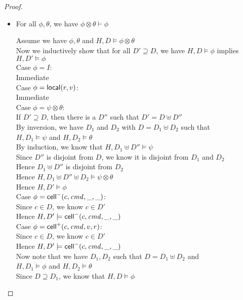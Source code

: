 \begin{proof}
\begin{itemize}
\item For all $\phi, \theta$, we have $\phi \otimes \theta \vdash \phi$
\begin{tabbedproof}
\oo Assume we have $\phi, \theta$ and $H, D \models \phi \otimes \theta$ \\
\oo Now we inductively show that for all $D' \supseteq D$, we have $H, D \models \phi$ implies $H, D' \models \phi$ \\
\ooo Case $\phi = I$: \\
\oooo Immediate \\
\ooo Case $\phi = \mathsf{local}({r}, {v})$: \\
\oooo Immediate\\
\ooo Case $\phi = \psi \otimes \theta$: \\
\oooo If $D' \supseteq D$, then there is a $D''$ such that $D' = D \uplus D''$ \\
\oooo By inversion, we have $D_1$ and $D_2$ with $D = D_1 \uplus D_2$ such that \\
\ooox $H, D_1 \models \psi$ and $H, D_2 \models \theta$ \\
\oooo By induction, we know that $H, D_1 \uplus D'' \models \psi$ \\
\oooo Since $D''$ is disjoint from $D$, we know it is disjoint from $D_1$ and $D_2$ \\
\oooo Hence $D_1 \uplus D''$ is disjoint from $D_2$ \\
\oooo Hence $H, D_1 \uplus D'' \uplus D_2 \models \psi \otimes \theta$ \\
\oooo Hence $H, D' \models \phi$ \\
\ooo Case $\phi = \mathsf{cell}^{-}({c}, {\mathit{cmd}}, {\_}, {\_})$: \\
\oooo Since $c \in D$, we know $c \in D'$ \\
\oooo Hence $H, D' \models \mathsf{cell}^{-}({c}, {\mathit{cmd}}, {\_}, {\_})$ \\
\ooo Case $\phi = \mathsf{cell}^{+}({c}, {\mathit{cmd}}, {v}, {r})$: \\
\oooo Since $c \in D$, we know $c \in D'$ \\
\oooo Hence $H, D' \models \mathsf{cell}^{-}({c}, {\mathit{cmd}}, {\_}, {\_})$ \\
\oo Now note that we have $D_1, D_2$ such that $D = D_1 \uplus D_2$ and \\
\ox $H, D_1 \models \phi$ and $H, D_2 \models \theta$ \\
\oo Since $D \supseteq D_1$, we know that $H, D \models \phi$ \\
\end{tabbedproof}


\end{itemize}
\end{proof}

